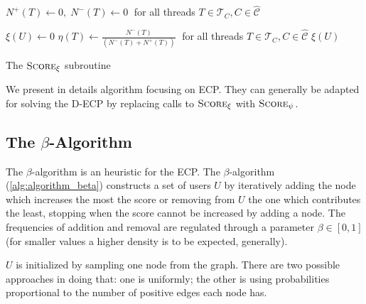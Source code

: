 \begin{algorithm}
	\SetAlgoLined
	$N^{+} (T) \leftarrow 0, \; N^{-} (T) \leftarrow 0\; $ for all threads $T
		\in \mathcal{T}_{C}, C \in \mathcal{\hat{C}}   $ \;


	$\xi(U) \leftarrow 0$ \;
	$\eta(T) \leftarrow\frac{N^{-}(T)}{(N^{-}(T) + N^{+} (T))} \; $ for all threads $T
		\in \mathcal{T}_{C}, C \in \mathcal{\hat{C}}   $  \;
	\Return $\xi(U)$ \;

	\caption{The $\textsc{Score}_{\xi}  $ subroutine}
	\label{alg:score_xi}
\end{algorithm}

We present in details algorithm focusing on \acrshort{ECP}. They can generally be
adapted for solving the \acrshort{D-ECP} by replacing calls to
$\textsc{Score}_{\xi}$ with $\textsc{Score}_{\psi}$.

\subsection{The $\beta$-Algorithm}%
\label{ssub:the_beta_approach}

The $\beta$-algorithm is an heuristic for the \acrshort{ECP}. The
$\beta$-algorithm (\autoref{alg:algorithm_beta}) constructs a set of users $U$ by
iteratively adding the node which increases the most the score or removing from
$U$ the one which contributes the least, stopping when the score cannot be
increased by adding a node. The frequencies of addition and removal are regulated
through a parameter $\beta \in [0, 1]$ (for smaller values a higher density is to be expected,
generally).

$U$ is initialized by sampling one node from the graph. There are two possible
approaches in doing that: one is uniformly;
the other is using probabilities proportional to the number
of positive edges each node has.

